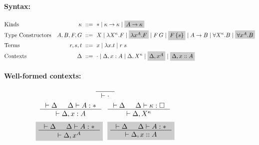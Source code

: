 \begin{figure}
\paragraph{Syntax:}
\begin{align*}
&\text{Kinds}
 	& \kappa		&~ ::= ~ *
				\mid \kappa -> \kappa
				\mid \newFi{A -> \kappa}
\\
&\text{Type Constructors}
	& A,B,F,G		&~ ::= ~ X
				\mid \lambda X^\kappa.F
				\mid \newFi{\lambda x^A.F}
				\mid F\,G
				\mid \newFi{F\,\{s\}}
				\mid A -> B
				\mid \forall X^\kappa . B
				\mid \newFi{\forall x^A . B}
\\
&\text{Terms}
	& r,s,t			&~ ::= ~ x \mid \lambda x.t \mid r\;s
\\
&\text{Contexts}
	& \Delta		&~ ::= ~ \cdot
				\mid \Delta, x : A
				\mid \Delta, X^\kappa
				\mid \newFi{\Delta, x^A}
				\mid \newFi{\Delta, x :: A}
\end{align*}

\noindent
\begin{minipage}{.45\textwidth}
\paragraph{Well-formed contexts:}
\[\!\!\!\!\!\!\!\!
   \inference{}{|- \cdot} \]
\[\!\!\!\!\!\!\!\!
   \inference{|- \Delta & \Delta |- A:*}{|- \Delta,x:A}
 ~~
   \inference{|- \Delta & \Delta |- \kappa:\square}{|- \Delta,X^\kappa}
\]
\[\!\!\!\!\!\!\!\! \newFi{
   \inference{|- \Delta & \Delta |- A:*}{|- \Delta,x^A} }
 ~~ \newFi{
   \inference{|- \Delta & \Delta |- A:*}{|- \Delta,x::A} }
\]
\end{minipage}~~
~~
\begin{minipage}{.2\textwidth}

\end{minipage}
\end{figure}
